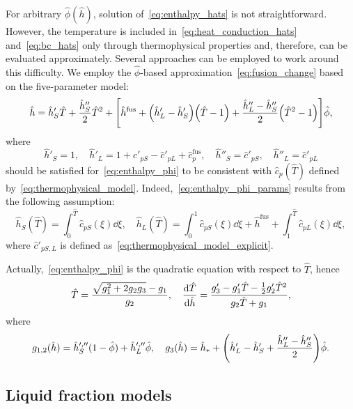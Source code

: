 \documentclass{article}
\newcommand{\fusion}[1]{{#1}^\mathrm{fus}}
\newcommand{\Hh}{\hat{h}}
\newcommand{\HT}{\hat{T}}
\newcommand{\Hc}{\hat{c}}
\newcommand{\Hphi}{\hat{\phi}}
\begin{document}
For arbitrary \(\Hphi(\Hh)\), solution of~\eqref{eq:enthalpy_hats} is not straightforward.
However, the temperature is included in~\eqref{eq:heat_conduction_hats} and~\eqref{eq:bc_hats}
only through thermophysical properties and, therefore, can be evaluated approximately.
Several approaches can be employed to work around this difficulty.
We employ the \(\Hphi\)-based approximation~\eqref{eq:fusion_change} based on the five-parameter model:
\begin{equation}\label{eq:enthalpy_phi}
	\Hh = \Hh'_S\HT + \frac{\Hh''_S}2\HT^2 + \qty[
	    \fusion{\Hh} + \qty(\Hh'_L-\Hh'_S) \qty(\HT-1) + \frac{\Hh''_L-\Hh''_S}2 \qty( \HT^2-1 )
	]\Hphi,
\end{equation}
where
\begin{equation}\label{eq:enthalpy_phi_params}
	\Hh'_S = 1, \quad \Hh'_L = 1 + \Hc'_{pS} - \Hc'_{pL} + \fusion{\Hc}_p, \quad
	\Hh''_S = \Hc'_{pS}, \quad \Hh''_L = \Hc'_{pL}
\end{equation}
should be satisfied for~\eqref{eq:enthalpy_phi} to be consistent with \(\Hc_p(\HT)\)
defined by~\eqref{eq:thermophysical_model}.
Indeed,~\eqref{eq:enthalpy_phi_params} results from the following assumption:
\begin{equation}\label{eq:enthalpy_phi_explicit}
	\Hh_S(\HT) = \int_0^{\HT} \Hc_{pS}(\xi)\dd{\xi}, \quad
	\Hh_L(\HT) = \int_0^1 \Hc_{pS}(\xi)\dd{\xi} + \fusion{\Hh} + \int_1^{\HT} \Hc_{pL}(\xi)\dd{\xi},
\end{equation}
where \(\Hc'_{pS,L}\) is defined as~\eqref{eq:thermophysical_model_explicit}.

Actually,~\eqref{eq:enthalpy_phi} is the quadratic equation with respect to \(\HT\), hence
\begin{equation}\label{eq:temp_phi}
	\HT = \frac{\sqrt{g_1^2 + 2g_2g_3}-g_1}{g_2}, \quad
	\dv{\HT}{\Hh} = \frac{g_3' - g_1'\HT - \frac12g_2'\HT^2}{g_2\HT + g_1},
\end{equation}
where
\begin{equation}\label{eq:enthalpy3_phi}
    g_{1,2}(\Hh) = \Hh_S^{\prime,\prime\prime} (1-\Hphi) + \Hh_L^{\prime,\prime\prime}\Hphi, \quad
	g_3(\Hh) = \Hh_* + \qty(\Hh_L' - \Hh_S' + \frac{\Hh_L'' - \Hh_S''}2)\Hphi.
\end{equation}

\subsection{Liquid fraction models}
\end{document}
